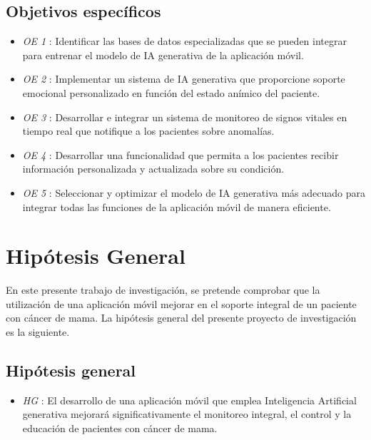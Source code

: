  \subsection{Objetivos específicos}
 \begin{itemize}
         \item \textit{OE 1} : Identificar las bases de datos especializadas que se pueden integrar para entrenar el modelo de IA generativa de la aplicación móvil.
         \item \textit{OE 2} : Implementar un sistema de IA generativa que proporcione soporte emocional personalizado en función del estado anímico del paciente.
         \item \textit{OE 3} : Desarrollar e integrar un sistema de monitoreo de signos vitales en tiempo real que notifique a los pacientes sobre anomalías.
         \item \textit{OE 4} : Desarrollar una funcionalidad que permita a los pacientes recibir información personalizada y actualizada sobre su condición.
         \item \textit{OE 5} : Seleccionar y optimizar el modelo de IA generativa más adecuado para integrar todas las funciones de la aplicación móvil de manera eficiente.
\end{itemize}
\section{Hipótesis General}
En este presente trabajo de investigación, se pretende comprobar que la utilización de una aplicación móvil mejorar en el soporte integral de un paciente con cáncer de mama. La hipótesis general del presente proyecto de investigación es la siguiente.
\subsection{Hipótesis general }
\begin{itemize}
	\item \textit{HG} : El desarrollo de una aplicación móvil que emplea Inteligencia Artificial generativa mejorará significativamente el monitoreo integral, el control y la educación de pacientes con cáncer de mama.
 
\end{itemize}

